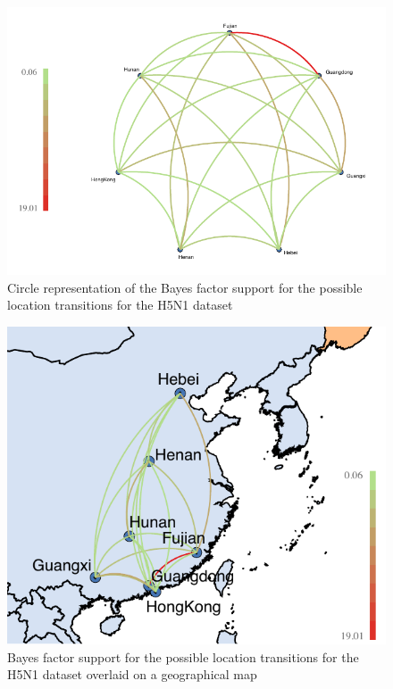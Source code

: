 \documentclass[english]{paper}
\begin{document}
\begin{figure}[!H]
\centering
\includegraphics[width=1\textwidth]{./figures/bf_circle_final.pdf} %
\caption{Circle representation of the Bayes factor support for the possible location transitions for the H5N1 dataset}
\label{fig:BFcircle}
\end{figure}

\begin{figure}[!H]
\centering
\includegraphics[width=1\textwidth]{./figures/bf_map_final.pdf} %
\caption{Bayes factor support for the possible location transitions for the H5N1 dataset overlaid on a geographical map}
\label{fig:BFmap}
\end{figure}
\end{document}
